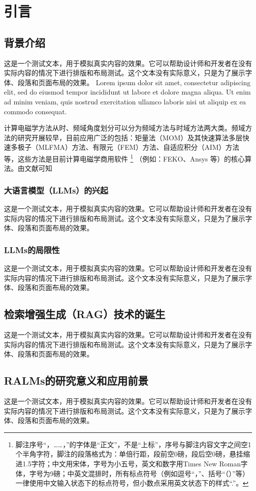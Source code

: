 \chapter{引\hspace{6pt}言}

\section{背景介绍}

这是一个测试文本，用于模拟真实内容的效果。它可以帮助设计师和开发者在没有实际内容的情况下进行排版和布局测试。这个文本没有实际意义，只是为了展示字体、段落和页面布局的效果。
Lorem ipsum dolor sit amet, consectetur adipiscing elit, sed do eiusmod tempor incididunt ut labore et dolore magna aliqua. Ut enim ad minim veniam, quis nostrud exercitation ullamco laboris nisi ut aliquip ex ea commodo consequat.

计算电磁学方法从时、频域角度划分可以分为频域方法与时域方法两大类。频域方法的研究开展较早，目前应用广泛的包括：矩量法（MOM）及其快速算法多层快速多极子（MLFMA）方法、有限元（FEM）方法、自适应积分（AIM）方法等，这些方法是目前计算电磁学商用软件
\footnote{脚注序号“，……，”的字体是“正文”，不是“上标”，序号与脚注内容文字之间空1个半角字符，脚注的段落格式为：单倍行距，段前空0磅，段后空0磅，悬挂缩进1.5字符；中文用宋体，字号为小五号，英文和数字用Times New Roman字体，字号为9磅；中英文混排时，所有标点符号（例如逗号“，”、括号“（）”等）一律使用中文输入状态下的标点符号，但小数点采用英文状态下的样式“.”。}
（例如：FEKO、Ansys 等）的核心算法。由文献\cite{feng997he,clerc2010discrete,xiao2012yi}可知

\subsection{大语言模型（LLMs）的兴起}
这是一个测试文本，用于模拟真实内容的效果。它可以帮助设计师和开发者在没有实际内容的情况下进行排版和布局测试。这个文本没有实际意义，只是为了展示字体、段落和页面布局的效果。

\subsection{LLMs的局限性}
这是一个测试文本，用于模拟真实内容的效果。它可以帮助设计师和开发者在没有实际内容的情况下进行排版和布局测试。这个文本没有实际意义，只是为了展示字体、段落和页面布局的效果。

\section{检索增强生成（RAG）技术的诞生}
这是一个测试文本，用于模拟真实内容的效果。它可以帮助设计师和开发者在没有实际内容的情况下进行排版和布局测试。这个文本没有实际意义，只是为了展示字体、段落和页面布局的效果。

\section{RALMs的研究意义和应用前景}
这是一个测试文本，用于模拟真实内容的效果。它可以帮助设计师和开发者在没有实际内容的情况下进行排版和布局测试。这个文本没有实际意义，只是为了展示字体、段落和页面布局的效果。
